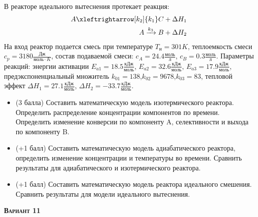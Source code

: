  В реакторе идеального вытеснения протекает реакция: \begin{equation*} \begin{aligned} A \xleftrightarrow[k_2]{k_1} C + \Delta H_1 \\ A \xrightarrow{k_3} B + \Delta H_2 \end{aligned} \end{equation*}                                      На вход  реактор подается смесь при температуре $ T_н =  301 K$, теплоемкость смеси $c_p= 3180 \frac{Дж}{моль \cdot K}$, состав подаваемой смеси: $c_A=24.4 \frac{моль}{л}$, $c_B=0.3 \frac{моль}{л}$. Параметры реакций: энергии активации $E_{a1}=18.5 \frac{кДж}{моль}$, $E_{a2}=32.6  \frac{кДж}{моль}$, $E_{a3}=17.9  \frac{кДж}{моль}$, предэкспоненциальный множитель $k_{01}=       138$,$k_{02}=      9678$,$k_{03}=        83$, тепловой эффект $\Delta H_1= 27.1  \frac{кДж}{моль}$, $\Delta H_2=-33.7 \frac{кДж}{моль}$.\begin{itemize} \item (3 балла) Составить математическую модель изотермического реактора. Определить распределение концентрации компонентов по времени. Определить изменение конверсии по компоненту A, селективности и выхода по компоненту B. \item (+1 балл) Составить математическую модель адиабатического реактора, определить изменение концентрации и температуры во времени. Сравнить результаты для адиабатического и изотермического реактора. \item (+1 балл) Составить математическую модель реактора идеального смешения. Сравнить результаты для модели идеального вытеснения. \end{itemize}

\textsc{\textbf{Вариант 11}}

